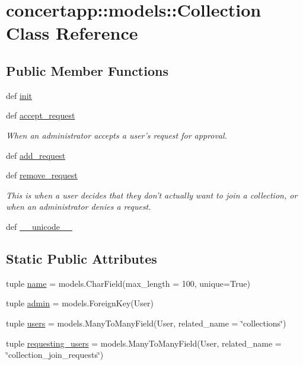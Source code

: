 \hypertarget{classconcertapp_1_1models_1_1_collection}{
\section{concertapp::models::Collection Class Reference}
\label{classconcertapp_1_1models_1_1_collection}
}
\subsection*{Public Member Functions}
\begin{DoxyCompactItemize}
\item 
def \hyperlink{classconcertapp_1_1models_1_1_collection_a36966578f0b8bf4e4b64af0d4bc00609}{init}
\item 
def \hyperlink{classconcertapp_1_1models_1_1_collection_a84be2004b26a0642d4c393bb760dc782}{accept\_\-request}
\begin{DoxyCompactList}\small\item\em When an administrator accepts a user's request for approval. \item\end{DoxyCompactList}\item 
def \hyperlink{classconcertapp_1_1models_1_1_collection_ae4b3b909d5a8878df1cfb6c5fc26c821}{add\_\-request}
\item 
def \hyperlink{classconcertapp_1_1models_1_1_collection_a738c232b3995f1e8e1eb012fdad9c80e}{remove\_\-request}
\begin{DoxyCompactList}\small\item\em This is when a user decides that they don't actually want to join a collection, or when an administrator denies a request. \item\end{DoxyCompactList}\item 
def \hyperlink{classconcertapp_1_1models_1_1_collection_af275929542b8756be156b4af64acb9d2}{\_\-\_\-unicode\_\-\_\-}
\end{DoxyCompactItemize}
\subsection*{Static Public Attributes}
\begin{DoxyCompactItemize}
\item 
tuple \hyperlink{classconcertapp_1_1models_1_1_collection_a392d7a6c719983f7e96a36ebc5b0b696}{name} = models.CharField(max\_\-length = 100, unique=True)
\item 
tuple \hyperlink{classconcertapp_1_1models_1_1_collection_a72a91bd0d880ea84f678d0544c7350be}{admin} = models.ForeignKey(User)
\item 
tuple \hyperlink{classconcertapp_1_1models_1_1_collection_aee261cad48467e51bb8afd390b90b0bd}{users} = models.ManyToManyField(User, related\_\-name = \char`\"{}collections\char`\"{})
\item 
tuple \hyperlink{classconcertapp_1_1models_1_1_collection_a9753ffd883189e01f654151773b2789d}{requesting\_\-users} = models.ManyToManyField(User, related\_\-name = \char`\"{}collection\_\-join\_\-requests\char`\"{})
\end{DoxyCompactItemize}


